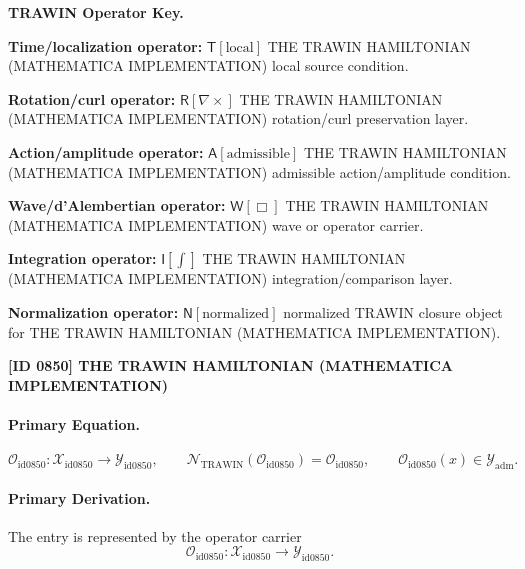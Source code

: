 \par\vspace{0.45\baselineskip}
\noindent\begin{minipage}[t]{\linewidth}
\begingroup
\small
\raggedright
\textbf{TRAWIN Operator Key.}\par
\noindent\textbf{Time/localization operator:} $\mathsf{T}\!\left[\mathrm{local}\right]$ THE TRAWIN HAMILTONIAN (MATHEMATICA IMPLEMENTATION) local source condition.\par
\noindent\textbf{Rotation/curl operator:} $\mathsf{R}\!\left[\nabla\times\right]$ THE TRAWIN HAMILTONIAN (MATHEMATICA IMPLEMENTATION) rotation/curl preservation layer.\par
\noindent\textbf{Action/amplitude operator:} $\mathsf{A}\!\left[\mathrm{admissible}\right]$ THE TRAWIN HAMILTONIAN (MATHEMATICA IMPLEMENTATION) admissible action/amplitude condition.\par
\noindent\textbf{Wave/d'Alembertian operator:} $\mathsf{W}\!\left[\Box\right]$ THE TRAWIN HAMILTONIAN (MATHEMATICA IMPLEMENTATION) wave or operator carrier.\par
\noindent\textbf{Integration operator:} $\mathsf{I}\!\left[\int\right]$ THE TRAWIN HAMILTONIAN (MATHEMATICA IMPLEMENTATION) integration/comparison layer.\par
\noindent\textbf{Normalization operator:} $\mathsf{N}\!\left[\mathrm{normalized}\right]$ normalized TRAWIN closure object for THE TRAWIN HAMILTONIAN (MATHEMATICA IMPLEMENTATION).\par
\endgroup
\end{minipage}

\clearpage
\noindent\textbf{[ID 0850] THE TRAWIN HAMILTONIAN (MATHEMATICA IMPLEMENTATION)}\par
\vspace{0.35em}
\paragraph{Primary Equation.}
\[
\mathcal{O}_{\mathrm{id0850}}:\mathcal{X}_{\mathrm{id0850}}\longrightarrow \mathcal{Y}_{\mathrm{id0850}},\qquad
\mathcal{N}_{\mathrm{TRAWIN}}(\mathcal{O}_{\mathrm{id0850}})=\mathcal{O}_{\mathrm{id0850}},\qquad
\mathcal{O}_{\mathrm{id0850}}(x)\in\mathcal{Y}_{\mathrm{adm}}.
\]

\paragraph{Primary Derivation.} The entry is represented by the operator carrier\[
\mathcal{O}_{\mathrm{id0850}}:\mathcal{X}_{\mathrm{id0850}}\longrightarrow \mathcal{Y}_{\mathrm{id0850}}.
\]

